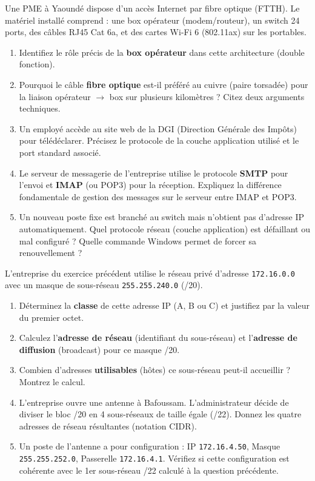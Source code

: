 \documentclass[11pt]{article}
\begin{document}
\begin{exercice}
Une PME à Yaoundé dispose d'un accès Internet par fibre optique (FTTH). Le matériel installé comprend : une box opérateur (modem/routeur), un switch 24 ports, des câbles RJ45 Cat 6a, et des cartes Wi-Fi 6 (802.11ax) sur les portables.

\begin{enumerate}
    \item Identifiez le rôle précis de la \textbf{box opérateur} dans cette architecture (double fonction).
    \item Pourquoi le câble \textbf{ fibre optique} est-il préféré au cuivre (paire torsadée) pour la liaison opérateur $\rightarrow$ box sur plusieurs kilomètres ? Citez deux arguments techniques.
    \item Un employé accède au site web de la DGI (Direction Générale des Impôts) pour télédéclarer. Précisez le protocole de la couche application utilisé et le port standard associé.
    \item Le serveur de messagerie de l'entreprise utilise le protocole \textbf{SMTP} pour l'envoi et \textbf{IMAP} (ou POP3) pour la réception. Expliquez la différence fondamentale de gestion des messages sur le serveur entre IMAP et POP3.
    \item Un nouveau poste fixe est branché au switch mais n'obtient pas d'adresse IP automatiquement. Quel protocole réseau (couche application) est défaillant ou mal configuré ? Quelle commande Windows permet de forcer sa renouvellement ?
\end{enumerate}
\end{exercice}

\begin{exercice}
L'entreprise du exercice précédent utilise le réseau privé d'adresse \texttt{172.16.0.0} avec un masque de sous-réseau \texttt{255.255.240.0} (/20).

\begin{enumerate}
    \item Déterminez la \textbf{classe} de cette adresse IP (A, B ou C) et justifiez par la valeur du premier octet.
    \item Calculez l'\textbf{adresse de réseau} (identifiant du sous-réseau) et l'\textbf{adresse de diffusion} (broadcast) pour ce masque /20.
    \item Combien d'adresses \textbf{utilisables} (hôtes) ce sous-réseau peut-il accueillir ? Montrez le calcul.
    \item L'entreprise ouvre une antenne à Bafoussam. L'administrateur décide de diviser le bloc /20 en 4 sous-réseaux de taille égale (/22). Donnez les quatre adresses de réseau résultantes (notation CIDR).
    \item Un poste de l'antenne a pour configuration : IP \texttt{172.16.4.50}, Masque \texttt{255.255.252.0}, Passerelle \texttt{172.16.4.1}. Vérifiez si cette configuration est cohérente avec le 1er sous-réseau /22 calculé à la question précédente.
\end{enumerate}
\end{exercice}
\end{document}
